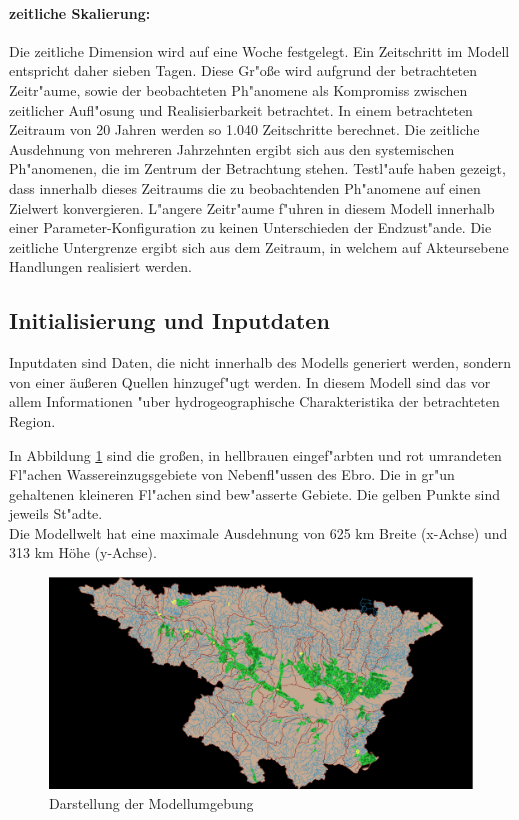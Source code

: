 \documentclass[11pt,a4paper]{article}
\begin{document}
\paragraph*{zeitliche Skalierung:}
Die zeitliche Dimension wird auf eine Woche festgelegt. Ein Zeit\-schritt im Modell entspricht daher sieben Tagen. Diese Gr"oße wird aufgrund der betrachteten Zeitr"aume, sowie der beobachteten Ph"a\-no\-mene als Kompromiss zwischen zeitlicher Aufl"osung und Realisierbarkeit betrachtet. In einem betrachteten Zeitraum von 20 Jahren werden so 1.040 Zeit\-schritte berechnet. Die zeitliche Ausdehnung von mehreren Jahrzehnten ergibt sich aus den systemischen Ph"anomenen, die im Zentrum der Betrachtung stehen. Testl"aufe haben gezeigt, dass innerhalb dieses Zeitraums die zu beobachtenden Ph"anomene auf einen Zielwert konvergieren. L"angere Zeitr"aume f"uhren in diesem Modell innerhalb einer Parameter-Konfiguration zu keinen Unterschieden der Endzust"ande. Die zeitliche Untergrenze ergibt sich aus dem Zeitraum, in welchem auf Akteursebene Handlungen realisiert werden.\\


\subsection{Initialisierung und Inputdaten}\label{sec:Initialisierung}

Inputdaten sind Daten, die nicht innerhalb des Modells generiert werden, sondern von einer äußeren Quellen hinzugef"ugt werden. In diesem Modell sind das vor allem Informationen "uber hydrogeographische Charakteristika der betrachteten Region. 

In Abbildung \ref{fig:world} sind die großen, in hellbrauen eingef"arbten und rot umrandeten Fl"achen Wassereinzugsgebiete von Nebenfl"ussen des Ebro. Die in gr"un gehaltenen kleineren Fl"achen sind bew"asserte Gebiete. Die gelben Punkte sind jeweils St"adte.\\
Die Modellwelt hat eine maximale Ausdehnung von 625 km Breite (x-Achse) und 313 km Höhe (y-Achse).

\begin{figure}[h]
\centering
\includegraphics[width=\textwidth]{./world}
\caption{Darstellung der Modellumgebung}
\label{fig:world}
\end{figure}
\end{document}
